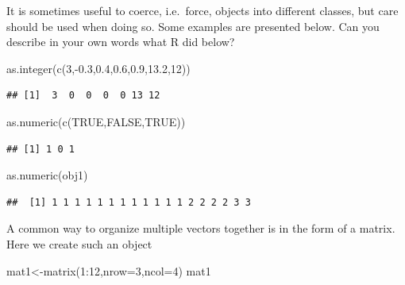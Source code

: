 \documentclass[
]{article}
\newenvironment{Shaded}{\begin{snugshade}}{\end{snugshade}}
\newcommand{\AttributeTok}[1]{\textcolor[rgb]{0.77,0.63,0.00}{#1}}
\newcommand{\ConstantTok}[1]{\textcolor[rgb]{0.00,0.00,0.00}{#1}}
\newcommand{\DecValTok}[1]{\textcolor[rgb]{0.00,0.00,0.81}{#1}}
\newcommand{\FloatTok}[1]{\textcolor[rgb]{0.00,0.00,0.81}{#1}}
\newcommand{\FunctionTok}[1]{\textcolor[rgb]{0.00,0.00,0.00}{#1}}
\newcommand{\NormalTok}[1]{#1}
\newcommand{\OtherTok}[1]{\textcolor[rgb]{0.56,0.35,0.01}{#1}}
\newcommand{\SpecialCharTok}[1]{\textcolor[rgb]{0.00,0.00,0.00}{#1}}
\begin{document}
It is sometimes useful to coerce, i.e.~force, objects into different
classes, but care should be used when doing so. Some examples are
presented below. Can you describe in your own words what R did below?

\begin{Shaded}
\begin{Highlighting}[]
\FunctionTok{as.integer}\NormalTok{(}\FunctionTok{c}\NormalTok{(}\DecValTok{3}\NormalTok{,}\SpecialCharTok{{-}}\FloatTok{0.3}\NormalTok{,}\FloatTok{0.4}\NormalTok{,}\FloatTok{0.6}\NormalTok{,}\FloatTok{0.9}\NormalTok{,}\FloatTok{13.2}\NormalTok{,}\DecValTok{12}\NormalTok{))}
\end{Highlighting}
\end{Shaded}

\begin{verbatim}
## [1]  3  0  0  0  0 13 12
\end{verbatim}

\begin{Shaded}
\begin{Highlighting}[]
\FunctionTok{as.numeric}\NormalTok{(}\FunctionTok{c}\NormalTok{(}\ConstantTok{TRUE}\NormalTok{,}\ConstantTok{FALSE}\NormalTok{,}\ConstantTok{TRUE}\NormalTok{))}
\end{Highlighting}
\end{Shaded}

\begin{verbatim}
## [1] 1 0 1
\end{verbatim}

\begin{Shaded}
\begin{Highlighting}[]
\FunctionTok{as.numeric}\NormalTok{(obj1)}
\end{Highlighting}
\end{Shaded}

\begin{verbatim}
##  [1] 1 1 1 1 1 1 1 1 1 1 1 1 2 2 2 2 3 3
\end{verbatim}

A common way to organize multiple vectors together is in the form of a
matrix. Here we create such an object

\begin{Shaded}
\begin{Highlighting}[]
\NormalTok{mat1}\OtherTok{\textless{}{-}}\FunctionTok{matrix}\NormalTok{(}\DecValTok{1}\SpecialCharTok{:}\DecValTok{12}\NormalTok{,}\AttributeTok{nrow=}\DecValTok{3}\NormalTok{,}\AttributeTok{ncol=}\DecValTok{4}\NormalTok{)}
\NormalTok{mat1}
\end{Highlighting}
\end{Shaded}
\end{document}
